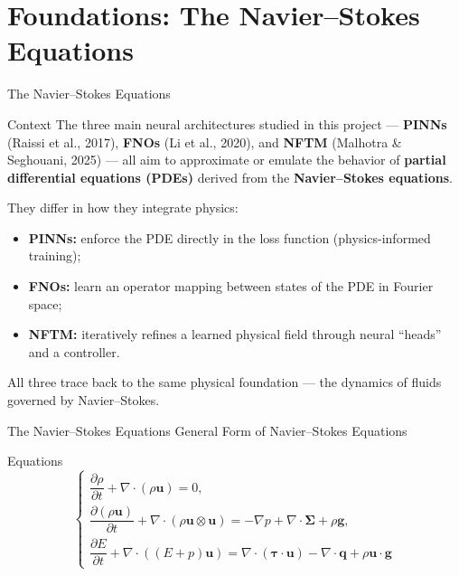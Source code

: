 \section{Foundations: The Navier--Stokes Equations}

\begin{frame}{The Navier--Stokes Equations}
\small

\vspace{0.6em}

\begin{block}{Context}
The three main neural architectures studied in this project —  
\textbf{PINNs} (Raissi et al., 2017), \textbf{FNOs} (Li et al., 2020),  
and \textbf{NFTM} (Malhotra \& Seghouani, 2025) —  
all aim to approximate or emulate the behavior of \textbf{partial differential equations (PDEs)} derived from the \textbf{Navier–Stokes equations}.  

They differ in how they integrate physics:
\begin{itemize}
  \item \textbf{PINNs:} enforce the PDE directly in the loss function (physics-informed training);
  \item \textbf{FNOs:} learn an operator mapping between states of the PDE in Fourier space;
  \item \textbf{NFTM:} iteratively refines a learned physical field through neural “heads” and a controller.
\end{itemize}
All three trace back to the same physical foundation — the dynamics of fluids governed by Navier–Stokes.
\end{block}
\end{frame}




\begin{frame}{The Navier--Stokes Equations}
\small
\textcolor{red_unipd}{\Large General Form of Navier--Stokes Equations}

\vspace{0.6em}

\begin{alertblock}{Equations}
\[
\begin{cases}
\dfrac{\partial \rho}{\partial t}
+ \nabla\!\cdot\!(\rho \mathbf{u}) = 0,\\[16pt]

\dfrac{\partial (\rho \mathbf{u})}{\partial t}
+ \nabla\!\cdot\!(\rho \mathbf{u} \otimes \mathbf{u})
= -\nabla p + \nabla\!\cdot\!\boldsymbol{\Sigma} + \rho \mathbf{g},\\[16pt]

\dfrac{\partial E}{\partial t}
+ \nabla\!\cdot\!((E+p)\mathbf{u})
= \nabla\!\cdot\!(\boldsymbol{\tau}\!\cdot\!\mathbf{u})
- \nabla\!\cdot\!\mathbf{q} + \rho \mathbf{u}\!\cdot\!\mathbf{g}
\end{cases}
\]
\end{alertblock}

\end{frame}





